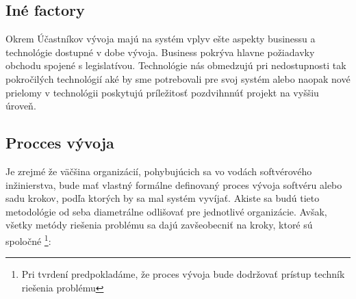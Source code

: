 \subsection{Iné factory}
Okrem Účastníkov vývoja majú na systém vplyv ešte aspekty businessu a technológie dostupné v dobe vývoja. Business pokrýva hlavne požiadavky obchodu spojené s legislatívou. Technológie nás obmedzujú pri nedostupnosti tak pokročilých technológií aké by sme potrebovali pre svoj systém alebo naopak nové prielomy v technológii poskytujú príležitosť pozdvihnnúť projekt na vyššiu úroveň.

\subsection{Procces vývoja}
\label{proces_vyvoja}

Je zrejmé že väčšina organizácií, pohybujúcich sa vo vodách softvérového inžinierstva, bude mať vlastný formálne definovaný proces vývoja softvéru alebo sadu krokov, podľa ktorých by sa mal systém vyvíjať. Akiste sa budú tieto metodológie od seba diametrálne odlišovať pre jednotlivé organizácie. Avšak, všetky metódy riešenia problému sa dajú zavšeobecniť na kroky, ktoré sú spoločné \footnote{Pri tvrdení predpokladáme, že proces vývoja bude dodržovať prístup techník riešenia problému}: \\


